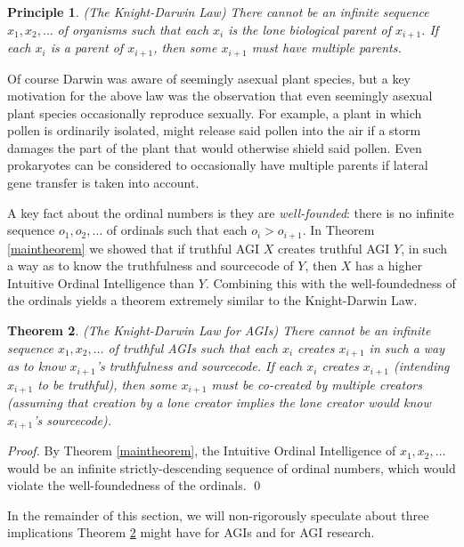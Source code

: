 \documentclass[runningheads]{llncs}
\newtheorem{mytheorem}{Theorem}
\newtheorem{myprinciple}[mytheorem]{Principle}
\begin{document}
\begin{myprinciple}
(The Knight-Darwin Law)
There cannot be an infinite sequence
$x_1,x_2,\ldots$ of organisms such that each $x_i$
is the lone biological parent of $x_{i+1}$.
If each $x_i$ is a parent of $x_{i+1}$, then some $x_{i+1}$
must have multiple parents.
\end{myprinciple}

Of course Darwin was aware of seemingly asexual plant species, but
a key motivation for the above law was the observation that even
seemingly asexual plant species occasionally reproduce sexually.
For example, a plant in which pollen is ordinarily isolated, might
release said pollen into the air if a storm damages the part of the
plant that would otherwise shield said pollen. Even prokaryotes can
be considered to occasionally have multiple parents if lateral gene
transfer is taken into account.

A key fact about the ordinal numbers is they are
\emph{well-founded}: there is
no infinite sequence $o_1,o_2,\ldots$ of ordinals such that each
$o_i>o_{i+1}$. In Theorem \ref{maintheorem} we showed that if truthful
AGI $X$ creates truthful AGI $Y$, in such a way as to know the truthfulness
and sourcecode of $Y$, then $X$ has a higher Intuitive Ordinal Intelligence
than $Y$. Combining this with the well-foundedness of the ordinals yields
a theorem extremely similar to the Knight-Darwin Law.

\begin{mytheorem}
\label{maintheorem2}
(The Knight-Darwin Law for AGIs)
There cannot be an infinite sequence
$x_1,x_2,\ldots$ of truthful AGIs such that each $x_i$
creates $x_{i+1}$ in such a way as to know $x_{i+1}$'s truthfulness and sourcecode.
If each $x_i$ creates $x_{i+1}$ (intending $x_{i+1}$ to be truthful), then
some $x_{i+1}$ must be co-created by multiple creators (assuming that creation by
a lone creator implies the lone creator would know $x_{i+1}$'s sourcecode).
\end{mytheorem}

\begin{proof}
By Theorem \ref{maintheorem}, the Intuitive Ordinal Intelligence of $x_1,x_2,\ldots$
would be an infinite strictly-descending sequence of ordinal numbers, which would
violate the well-foundedness of the ordinals.
\qed
\end{proof}

In the remainder of this section, we will non-rigorously speculate about three implications
Theorem \ref{maintheorem2} might have for AGIs and for AGI research.
\end{document}
